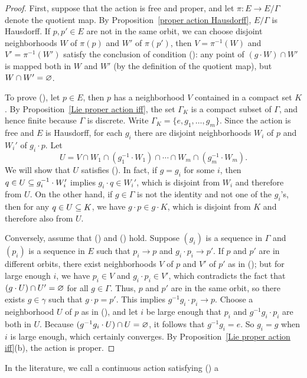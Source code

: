 \begin{proof}
First, suppose that the action is free and proper, and let $\pi:E\to E/\Gamma$ denote the quotient map. By Proposition~\ref{proper action Hausdorff}, $E/\Gamma$ is Hausdorff. If $p,p'\in E$ are not in the same orbit, we can choose disjoint neighborhoods $W$ of $\pi(p)$ and $W'$ of $\pi(p')$, then $V=\pi^{-1}(W)$ and $V'=\pi^{-1}(W')$ satisfy the conclusion of condition (): any point of $(g\cdot W)\cap W'$ is mapped both in $W$ and $W'$ (by the definition of the quotient map), but $W\cap W'=\varnothing$.\par
To prove (), let $p\in E$, then $p$ has a neighborhood $V$ contained in a compact set $K$. By Proposition~\ref{Lie proper action iff}, the set $\Gamma_{K}$ is a compact subset of $\Gamma$, and hence finite because $\Gamma$ is discrete. Write $\Gamma_{K}=\{e,g_1,\dots,g_m\}$. Since the action is free and $E$ is Hausdorff, for each $g_i$ there are disjoint neighborhoods $W_i$ of $p$ and $W_i'$ of $g_i\cdot p$. Let
\[U=V\cap W_1\cap(g_1^{-1}\cdot W_1)\cap\cdots\cap W_m\cap(g_m^{-1}\cdot W_m).\]
We will show that $U$ satisfies (). In fact, if $g=g_i$ for some $i$, then $q\in U\subseteq g_i^{-1}\cdot W_i'$ implies $g_i\cdot q\in W_i'$, which is disjoint from $W_i$ and therefore from $U$. On the other hand, if $g\in\Gamma$ is not the identity and not one of the $g_i$'s, then for any $q\in U\subseteq K$, we have $g\cdot p\in g\cdot K$, which is disjoint from $K$ and therefore also from $U$.\par
Conversely, assume that () and () hold. Suppose $(g_i)$ is a sequence in $\Gamma$ and $(p_i)$ is a sequence in $E$ such that $p_i\to p$ and $g_i\cdot p_i\to p'$. If $p$ and $p'$ are in different orbits, there exist neighborhoods $V$ of $p$ and $V'$ of $p'$ as in (); but for large enough $i$, we have $p_i\in V$ and $g_i\cdot p_i\in V'$, which contradicts the fact that $(g\cdot U)\cap U'=\varnothing$ for all $g\in\Gamma$. Thus, $p$ and $p'$ are in the same orbit, so there exists $g\in\gamma$ such that $g\cdot p=p'$. This implies $g^{-1}g_i\cdot p_i\to p$. Choose a neighborhood $U$ of $p$ as in (), and let $i$ be large enough that $p_i$ and $g^{-1}g_i\cdot p_i$ are both in $U$. Because $(g^{-1}g_i\cdot U)\cap U=\varnothing$, it follows that $g^{-1}g_i=e$. So $g_i=g$ when $i$ is large enough, which certainly converges. By Proposition~\ref{Lie proper action iff}(b), the action is proper.
\end{proof}
In the literature, we call a continuous action satisfying () a 

